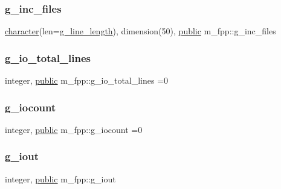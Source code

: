 \subsubsection{\texorpdfstring{g\+\_\+inc\+\_\+files}{g\_inc\_files}}
{\footnotesize\ttfamily \hyperlink{option__stopwatch_83_8txt_abd4b21fbbd175834027b5224bfe97e66}{character}(len=\hyperlink{namespacem__fpp_ab93f8756cf248cf8db932573009d4664}{g\+\_\+line\+\_\+length}), dimension(50), \hyperlink{M__stopwatch_83_8txt_a2f74811300c361e53b430611a7d1769f}{public} m\+\_\+fpp\+::g\+\_\+inc\+\_\+files}

\mbox{\label{namespacem__fpp_ad1a67d3e00b9a0683ba0e10a42d0e588}} 
\subsubsection{\texorpdfstring{g\+\_\+io\+\_\+total\+\_\+lines}{g\_io\_total\_lines}}
{\footnotesize\ttfamily integer, \hyperlink{M__stopwatch_83_8txt_a2f74811300c361e53b430611a7d1769f}{public} m\+\_\+fpp\+::g\+\_\+io\+\_\+total\+\_\+lines =0}

\mbox{\label{namespacem__fpp_a4d1d9ddcc7abec412be3a3e6c99b19e1}} 
\subsubsection{\texorpdfstring{g\+\_\+iocount}{g\_iocount}}
{\footnotesize\ttfamily integer, \hyperlink{M__stopwatch_83_8txt_a2f74811300c361e53b430611a7d1769f}{public} m\+\_\+fpp\+::g\+\_\+iocount =0}

\mbox{\label{namespacem__fpp_a741d58e0caef7e3b1aa6e56796d6d705}} 
\subsubsection{\texorpdfstring{g\+\_\+iout}{g\_iout}}
{\footnotesize\ttfamily integer, \hyperlink{M__stopwatch_83_8txt_a2f74811300c361e53b430611a7d1769f}{public} m\+\_\+fpp\+::g\+\_\+iout}

